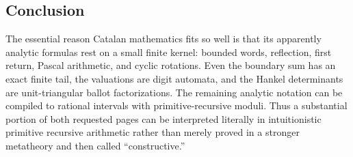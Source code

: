 \subsection{Conclusion}

The essential reason Catalan mathematics fits \ipra{} so well is that its
apparently analytic formulas rest on a small finite kernel: bounded words,
reflection, first return, Pascal arithmetic, and cyclic rotations.  Even the
boundary sum has an exact finite tail, the valuations are digit automata, and
the Hankel determinants are unit-triangular ballot factorizations.  The
remaining analytic notation can be compiled to rational intervals with
primitive-recursive moduli.  Thus a substantial portion of both requested
pages can be interpreted literally in intuitionistic primitive recursive
arithmetic rather than merely proved in a stronger metatheory and then called
``constructive.''

